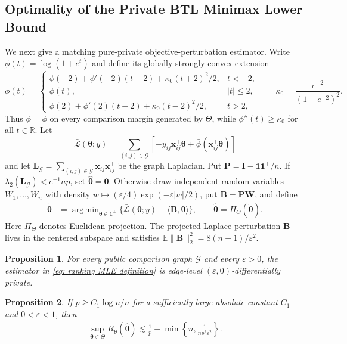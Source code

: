 \documentclass[letterpaper,12pt]{article}
\numberwithin{equation}{section}
\theoremstyle{plain}
\numberwithin{Theorem}{section}
\newtheorem{proposition}{Proposition}
\numberwithin{proposition}{section}
\numberwithin{Lemma}{section}
{
	\theoremstyle{definition}
	\newtheorem{Definition}{Definition}
	\newtheorem{example}{Example}
	\numberwithin{example}{section}
	\newtheorem{fact}{Fact}
	\numberwithin{fact}{section}
	\newtheorem{remark}{Remark}
}
\newcommand{\1}{\mathbbm{1}}
\def\bth{{\boldsymbol{\theta}}}
\DeclareMathOperator*{\argmin}{arg\,min}
\def\R{{\mathbb R}}
\def\E{\mathbb{E}}
\begin{document}
{\subsection{Optimality of the Private BTL Minimax Lower Bound}\label{sec: ranking upper bound}

We next give a matching pure-private objective-perturbation estimator. Write
$\phi(t)=\log(1+e^t)$ and define its globally strongly convex extension
\[
\bar\phi(t)=
\begin{cases}
\phi(-2)+\phi'(-2)(t+2)+\kappa_0(t+2)^2/2,&t<-2,\\
\phi(t),&|t|\leq2,\\
\phi(2)+\phi'(2)(t-2)+\kappa_0(t-2)^2/2,&t>2,
\end{cases}
\qquad
\kappa_0=\frac{e^{-2}}{(1+e^{-2})^2}.
\]
Thus $\bar\phi=\phi$ on every comparison margin generated by $\Theta$, while
$\bar\phi''(t)\geq\kappa_0$ for all $t\in\R$. Let
\[
\bar{\mathcal L}(\bth;y)=\sum_{(i,j)\in\mathcal G}
\left[-y_{ij}\bm x_{ij}^\top\bth+\bar\phi(\bm x_{ij}^\top\bth)\right]
\]
and let $\bm L_{\mathcal G}=\sum_{(i,j)\in\mathcal G}\bm x_{ij}\bm x_{ij}^\top$ be the graph Laplacian. Put $\bm P=\bm I-\bm1\bm1^\top/n$. If $\lambda_2(\bm L_{\mathcal G})<e^{-1}np$, set $\hat\bth=\bm0$. Otherwise draw independent random variables $W_1,\ldots,W_n$ with density
$w\mapsto(\varepsilon/4)\exp(-\varepsilon|w|/2)$, put $\bm B=\bm P\bm W$, and define
\begin{align}\label{eq: ranking MLE definition}
\widetilde\bth
&=\argmin_{\bth\in\bm1^\perp}
\{\bar{\mathcal L}(\bth;y)+\langle\bm B,\bth\rangle\},
\qquad
\hat\bth=\Pi_\Theta(\widetilde\bth).
\end{align}
Here $\Pi_\Theta$ denotes Euclidean projection. The projected Laplace perturbation
$\bm B$ lives in the centered subspace and satisfies
$\E\|\bm B\|_2^2=8(n-1)/\varepsilon^2$.

\begin{proposition}\label{prop: ranking MLE privacy}
For every public comparison graph $\mathcal G$ and every $\varepsilon>0$, the estimator in \eqref{eq: ranking MLE definition} is edge-level $(\varepsilon,0)$-differentially private.
\end{proposition}

\begin{proposition}\label{prop: ranking MLE accuracy}
If $p\geq C_1\log n/n$ for a sufficiently large absolute constant $C_1$ and $0<\varepsilon<1$, then
\begin{align*}
\sup_{\bth\in\Theta}R_\bth(\hat\bth)
\lesssim \frac1p+\min\left\{n,\frac{1}{np^2\varepsilon^2}\right\}.
\end{align*}
\end{proposition}

}
\end{document}

